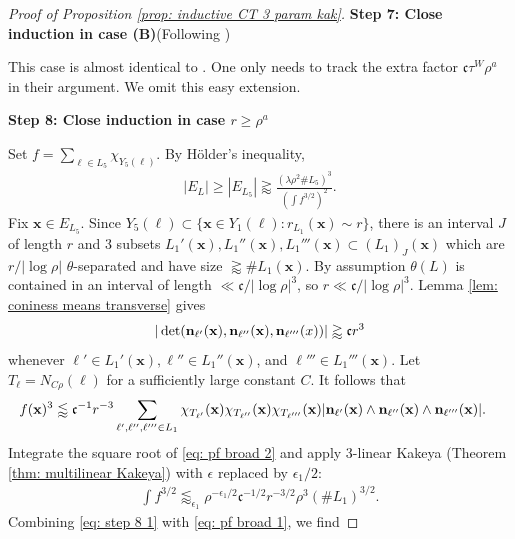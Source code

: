 \documentclass[12pt]{amsart}
\newcommand{\x}{{\bf{x}}}
\numberwithin{equation}{section}
\newcommand{\bn}{\mathbf{n}}
\renewcommand{\bn}{{\bf n}}
\newcommand{\1}{\mathbbm{1}}
\renewcommand{\x}{\mathbf x}
\begin{document}
\begin{proof}[Proof of Proposition \ref{prop: inductive CT 3 param kak}]
    \medskip 
    
    \noindent \textbf{Step 7: Close induction in case (B)}(Following \cite[Step 7 pg. 19]{KWZ})

    This case is almost identical to \cite{KWZ}. One only needs to track the extra factor $\mathfrak c \tau^W \rho^a$ in their argument. We omit this easy extension. 

    \medskip

    \noindent \textbf{Step 8: Close induction in case $r \geq \rho^a$}

    Set $f = \sum_{\ell \in L_5} \chi_{Y_5(\ell)}$. 
    By H\"older's inequality, 
    \begin{align}\label{eq: pf broad 1}
        |E_L| \geq |E_{L_5}| \gtrapprox \frac{(\lambda \rho^2 \# L_5)^3}{(\int f^{3/2})^2}.
    \end{align}
    Fix $\x \in E_{L_5}$. Since $Y_5(\ell) \subset \{\x \in Y_1(\ell) : r_{L_1}(\x) \sim r\}$, there is an interval $J$ of length $r$ and 3 subsets $L_1'(\x),L_1''(\x), L_1'''(\x) \subset (L_1)_J(\x)$ which are $r/|\log \rho|$ $\theta$-separated and have size $\gtrapprox \# L_1(\x)$. 
    By assumption $\theta(L)$ is contained in an interval of length $\ll \mathfrak c / |\log \rho|^3$, so $r \ll \mathfrak c/|\log \rho|^3$.
    Lemma \ref{lem: coniness means transverse} gives 
    \begin{align}
        |\det(\bn_{\ell'}(\x), \bn_{\ell''}(\x), \bn_{\ell'''}(x))| \gtrapprox \mathfrak{c} r^3
    \end{align}
    whenever $\ell' \in L_1'(\x), \ell'' \in L_1''(\x)$, and $\ell''' \in L_1'''(\x)$. 
    Let $T_\ell = N_{C\rho}(\ell)$ for a sufficiently large constant $C$. It follows that 
    \begin{align}
        f(\x)^3  &\lessapprox \mathfrak c^{-1} r^{-3} \sum_{\ell', \ell'', \ell''' \in L_1} \chi_{T_{\ell'}}(\x) \chi_{T_{\ell''}}(\x) \chi_{T_{\ell'''}}(\x)|\bn_{\ell'}(\x) \wedge \bn_{\ell''}(\x) \wedge \bn_{\ell'''}(\x)|. \label{eq: pf broad 2}
    \end{align}
    Integrate the square root of \eqref{eq: pf broad 2} and apply 3-linear Kakeya (Theorem \ref{thm: multilinear Kakeya}) with $\epsilon$ replaced by $\epsilon_1/2$: 
    \begin{align}\label{eq: step 8 1}
        \int f^{3/2} \lessapprox_{\epsilon_1} \rho^{-\epsilon_1/2} \mathfrak c^{-1/2} r^{-3/2} \rho^3 (\# L_1)^{3/2}. 
    \end{align}
    Combining \eqref{eq: step 8 1} with \eqref{eq: pf broad 1}, we find 

\end{proof}
\end{document}
